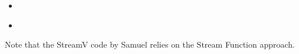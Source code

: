\begin{scriptsize}
\begin{itemize}
\item[2013]
 \\

\item[2024]
 \textbullet {}
 
\end{itemize}
\end{scriptsize}

Note that the StreamV code by Samuel relies on the Stream Function approach.



